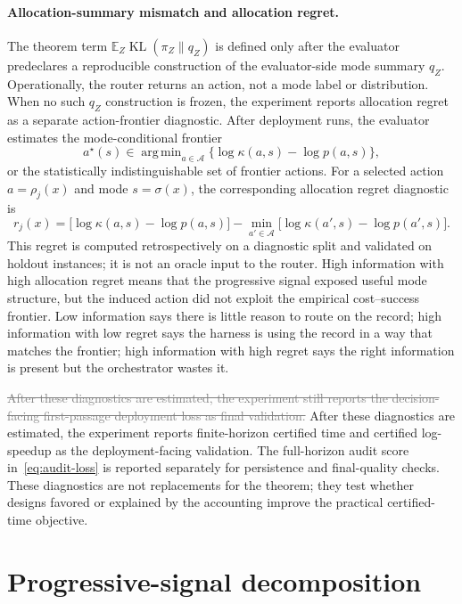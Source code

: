 \documentclass{article}
\newcommand{\oldtext}[1]{\textcolor{gray}{\sout{#1}}}
\newcommand{\newtext}[1]{\textcolor{green!50!black}{#1}}
\DeclareMathOperator*{\argmin}{arg\,min}
\DeclareMathOperator{\KL}{KL}
\newcommand{\cA}{\mathcal{A}}
\newcommand{\E}{\mathbb{E}}
\begin{document}
\paragraph{Allocation-summary mismatch and allocation regret.}
The theorem term $\E_Z\KL(\pi_Z\|q_Z)$ is defined only after the evaluator predeclares a reproducible construction of the evaluator-side mode summary $q_Z$.
Operationally, the router returns an action, not a mode label or distribution.
When no such $q_Z$ construction is frozen, the experiment reports allocation regret as a separate action-frontier diagnostic.
After deployment runs, the evaluator estimates the mode-conditional frontier
\[
a^\star(s)\in\argmin_{a\in\cA}\{\log\kappa(a,s)-\log p(a,s)\},
\]
or the statistically indistinguishable set of frontier actions.
For a selected action $a=\rho_j(x)$ and mode $s=\sigma(x)$, the corresponding allocation regret diagnostic is
\[
r_j(x)
=
\bigl[\log\kappa(a,s)-\log p(a,s)\bigr]
-
\min_{a'\in\cA}\bigl[\log\kappa(a',s)-\log p(a',s)\bigr].
\]
This regret is computed retrospectively on a diagnostic split and validated on holdout instances; it is not an oracle input to the router.
High information with high allocation regret means that the progressive signal exposed useful mode structure, but the induced action did not exploit the empirical cost--success frontier.
Low information says there is little reason to route on the record; high information with low regret says the harness is using the record in a way that matches the frontier; high information with high regret says the right information is present but the orchestrator wastes it.

\oldtext{After these diagnostics are estimated, the experiment still reports the decision-facing first-passage deployment loss as final validation.}
\newtext{After these diagnostics are estimated, the experiment reports finite-horizon certified time and certified log-speedup as the deployment-facing validation.}
The full-horizon audit score in~\eqref{eq:audit-loss} is reported separately for persistence and final-quality checks.
These diagnostics are not replacements for the theorem; they test whether designs favored or explained by the accounting improve the practical certified-time objective.

\section{Progressive-signal decomposition}
\label{app:operational-decomp}
\end{document}
